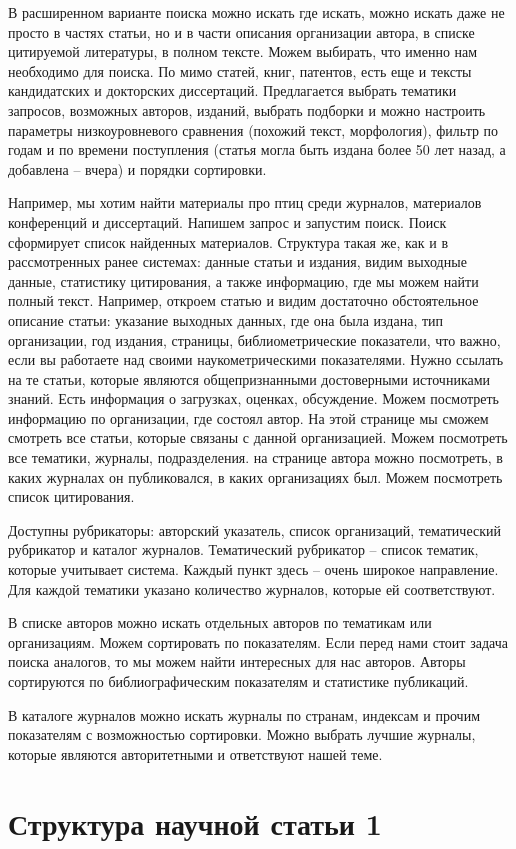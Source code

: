 \documentclass{report}
\begin{document}
В расширенном варианте поиска можно искать где искать, можно искать даже не просто в частях статьи, но и в части описания организации автора, в списке цитируемой литературы, в полном тексте. Можем выбирать, что именно нам необходимо для поиска. По мимо статей, книг, патентов, есть еще и тексты кандидатских и докторских диссертаций. Предлагается выбрать тематики запросов, возможных авторов, изданий, выбрать подборки и можно настроить параметры низкоуровневого сравнения (похожий текст, морфология), фильтр по годам и по времени поступления (статья могла быть издана более 50 лет назад, а добавлена -- вчера) и порядки сортировки. 

Например, мы хотим найти материалы про птиц среди журналов, материалов конференций и диссертаций. Напишем запрос и запустим поиск. Поиск сформирует список найденных материалов. Структура такая же, как и в рассмотренных ранее системах: данные статьи и издания, видим выходные данные, статистику цитирования, а также информацию, где мы можем найти полный текст. Например, откроем статью и видим достаточно обстоятельное описание статьи: указание выходных данных, где она была издана, тип организации, год издания, страницы, библиометрические показатели, что важно, если вы работаете над своими наукометрическими показателями. Нужно ссылать на те статьи, которые являются общепризнанными достоверными источниками знаний. Есть информация о загрузках, оценках, обсуждение. Можем посмотреть информацию по организации, где состоял автор. На этой странице мы сможем смотреть все статьи, которые связаны с данной организацией. Можем посмотреть все тематики, журналы, подразделения. на странице автора можно посмотреть, в каких журналах он публиковался, в каких организациях был. Можем посмотреть список цитирования. 

Доступны рубрикаторы: авторский указатель, список организаций, тематический рубрикатор и каталог журналов. Тематический рубрикатор -- список тематик, которые учитывает система. Каждый пункт здесь -- очень широкое направление. Для каждой тематики указано количество журналов, которые ей соответствуют. 

В списке авторов можно искать отдельных авторов по тематикам или организациям. Можем сортировать по показателям. Если перед нами стоит задача поиска аналогов, то мы можем найти интересных для нас авторов. Авторы сортируются по библиографическим показателям и статистике публикаций. 

В каталоге журналов можно искать журналы по странам, индексам и прочим показателям с возможностью сортировки. Можно выбрать лучшие журналы, которые являются авторитетными и ответствуют нашей теме. 


\chapter{Структура научной статьи 1}
\end{document}
